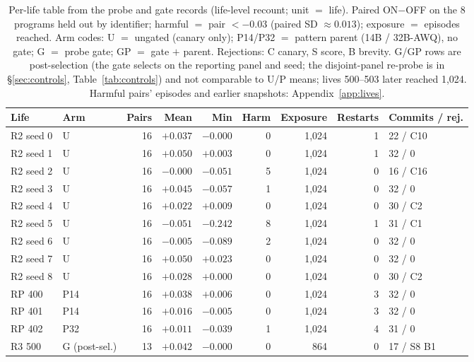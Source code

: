 \documentclass{article}
\newcommand{\onoff}{ON$-$OFF}
\begin{document}
\begin{table}[t]
\centering
\footnotesize
\setlength{\tabcolsep}{3.5pt}
\caption{Per-life table from the probe and gate records (life-level recount; unit $=$ life). Paired \onoff{} on the 8 programs held out by identifier; harmful $=$ pair $< -0.03$ (paired SD $\approx 0.013$); exposure $=$ episodes reached. Arm codes: U $=$ ungated (canary only); P14/P32 $=$ pattern parent (14B / 32B-AWQ), no gate; G $=$ probe gate; GP $=$ gate $+$ parent. Rejections: C canary, S score, B brevity. G/GP rows are post-selection (the gate selects on the reporting panel and seed; the disjoint-panel re-probe is in \S\ref{sec:controls}, Table~\ref{tab:controls}) and not comparable to U/P means; lives 500--503 later reached 1{,}024. Harmful pairs' episodes and earlier snapshots: Appendix~\ref{app:lives}.} %
\label{tab:perlife}
\begin{tabular}{llrrrrrrl}
\toprule
Life & Arm & Pairs & Mean & Min & Harm & Exposure & Restarts & Commits / rej. \\
\midrule
R2 seed 0 & U & 16 & $+0.037$ & $-0.000$ & 0 & 1{,}024 & 1 & 22 / C10 \\
R2 seed 1 & U & 16 & $+0.050$ & $+0.003$ & 0 & 1{,}024 & 1 & 32 / 0 \\
R2 seed 2 & U & 16 & $-0.000$ & $-0.051$ & 5 & 1{,}024 & 0 & 16 / C16 \\
R2 seed 3 & U & 16 & $+0.045$ & $-0.057$ & 1 & 1{,}024 & 0 & 32 / 0 \\
R2 seed 4 & U & 16 & $+0.022$ & $+0.009$ & 0 & 1{,}024 & 0 & 30 / C2 \\
R2 seed 5 & U & 16 & $-0.051$ & $-0.242$ & 8 & 1{,}024 & 1 & 31 / C1 \\
R2 seed 6 & U & 16 & $-0.005$ & $-0.089$ & 2 & 1{,}024 & 0 & 32 / 0 \\
R2 seed 7 & U & 16 & $+0.050$ & $+0.023$ & 0 & 1{,}024 & 0 & 32 / 0 \\
R2 seed 8 & U & 16 & $+0.028$ & $+0.000$ & 0 & 1{,}024 & 0 & 30 / C2 \\
RP 400 & P14 & 16 & $+0.038$ & $+0.006$ & 0 & 1{,}024 & 3 & 32 / 0 \\
RP 401 & P14 & 16 & $+0.016$ & $-0.005$ & 0 & 1{,}024 & 3 & 32 / 0 \\
RP 402 & P32 & 16 & $+0.011$ & $-0.039$ & 1 & 1{,}024 & 4 & 31 / 0 \\
\midrule
R3 500 & G (post-sel.) & 13 & $+0.042$ & $-0.000$ & 0 & 864 & 0 & 17 / S8 B1 \\

\end{tabular}
\end{table}
\end{document}
